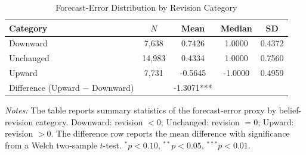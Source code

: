 \begin{table}[htbp]
\centering
\begin{threeparttable}
\caption{Forecast-Error Distribution by Revision Category}
\label{tab:fe_by_revision}
\begin{tabular}{lcccc}
\toprule
Category & $N$ & Mean & Median & SD \\
\midrule
Downward & 7,638 & 0.7426 & 1.0000 & 0.4372 \\
Unchanged & 14,983 & 0.4334 & 1.0000 & 0.7560 \\
Upward & 7,731 & -0.5645 & -1.0000 & 0.4959 \\
\midrule
Difference (Upward $-$ Downward) & & -1.3071*** & & \\
\bottomrule
\end{tabular}
\begin{tablenotes}[flushleft]\small
\item \textit{Notes:} The table reports summary statistics of the forecast-error proxy by belief-revision category. Downward: revision $< 0$; Unchanged: revision $= 0$; Upward: revision $> 0$. The difference row reports the mean difference with significance from a Welch two-sample $t$-test. $^{*}p<0.10$, $^{**}p<0.05$, $^{***}p<0.01$.
\end{tablenotes}
\end{threeparttable}
\end{table}
